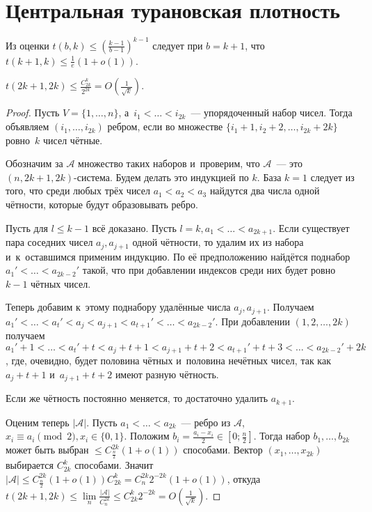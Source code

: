 \documentclass{article}
\begin{document}
\section{Центральная турановская плотность}

Из оценки $t(b, k) \le \left( \frac{k-1}{b-1}\right)^{k-1}$ следует при $b = k +
1$, что $t(k + 1, k) \le \frac{1}{e}(1 + o(1))$.

\begin{theorem}
	$t(2k + 1, 2k) \le \frac{C_{2k}^k}{2^{2k}} =
	O\left(\frac{1}{\sqrt{k}}\right)$.
\end{theorem}
\begin{proof}
	Пусть $V = \{1, \ldots, n\}$, а~$i_1 < \ldots < i_{2k}$~--- упорядоченный
	набор чисел. Тогда объявляем $(i_1, \ldots, i_{2k})$ ребром, если во множестве
	$\{i_1 + 1, i_2 + 2, \ldots, i_{2k} + 2k\}$ ровно~$k$ чисел чётные.

	Обозначим за $\mathcal{A}$ множество таких наборов и~проверим, что
	$\mathcal{A}$~--- это $(n, 2k + 1, 2k)$-система. Будем делать это индукцией по
	$k$. База $k = 1$ следует из того, что среди любых трёх чисел $a_1 < a_2 <
	a_3$ найдутся два числа одной чётности, которые будут образовывать ребро.

	Пусть для $l \le k - 1$ всё доказано. Пусть $l = k, a_1 < \ldots < a_{2k+1}$.
	Если существует пара соседних чисел $a_j, a_{j+1}$ одной чётности, то удалим
	их из набора и~к~оставшимся применим индукцию. По её предположению найдётся
	поднабор $a_1' < \ldots < a_{2k-2}'$ такой, что при добавлении индексов среди
	них будет ровно $k-1$ чётных чисел.

	Теперь добавим к~этому поднабору удалённые числа $a_j, a_{j+1}$. Получаем
	$a_1' < \ldots < a_t' < a_j < a_{j+1} < a_{t+1}' < \ldots < a_{2k-2}'$. При
	добавлении $(1, 2, \ldots, 2k)$ получаем $a_1' + 1 < \ldots < a_t' + t < a_j +
	t + 1 < a_{j+1} + t + 2 < a_{t+1}' + t + 3 < \ldots < a_{2k-2}' + 2k$, где,
	очевидно, будет половина чётных и~половина нечётных чисел, так как $a_{j} + t
	+ 1$ и~$a_{j+1} + t + 2$ имеют разную чётность.

	Если же чётность постоянно меняется, то достаточно удалить $a_{k+1}$.

	Оценим теперь $|\mathcal{A}|$. Пусть $a_1 < \ldots < a_{2k}$~--- ребро из
	$\mathcal{A}$, $x_i \equiv a_i \pmod 2, x_i \in \{0, 1\}$. Положим $b_i =
	\frac{a_i - x_i}{2} \in [0; \frac{n}{2}]$. Тогда набор $b_1, \ldots, b_{2k}$
	может быть выбран $\le C_{\frac{n}{2}}^{2k} (1 + o(1))$ способами. Вектор
	$(x_1, \ldots, x_{2k})$ выбирается $C_{2k}^k$ способами. Значит $|\mathcal{A}|
	\le C_{\frac{n}{2}}^{2k}(1 + o(1)) C_{2k}^k = C_n^{2k} 2^{-2k} (1 + o(1))$,
	откуда $t(2k + 1, 2k) \le \lim\limits_n \frac{|\mathcal{A}|}{C_n^{2k}} \le
	C_{2k}^k 2^{-2k} = O\left( \frac{1}{\sqrt{k}}\right)$.
\end{proof}
\end{document}
